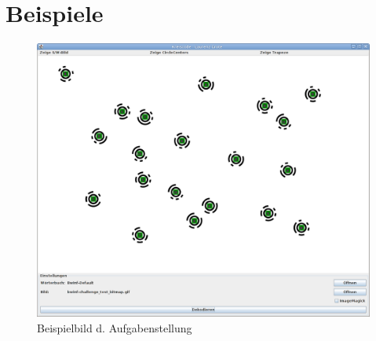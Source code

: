 \section{Beispiele}
\begin{figure}[!ht]
	\centering	
	\includegraphics[width=\textwidth]{Grafiken/sek2bsp1}
	\caption{Beispielbild d. Aufgabenstellung}
\end{figure}
